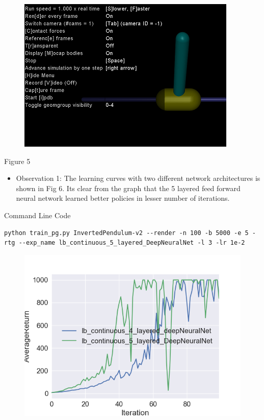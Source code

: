 \documentclass[10pt]{article}
\makeatletter
\def\maxwidth{\ifdim\Gin@nat@width>\linewidth\linewidth
\else\Gin@nat@width\fi}
\let\Oldincludegraphics\includegraphics
\renewcommand{\includegraphics}[1]{\Oldincludegraphics[width=\maxwidth]{#1}}
\makeatother
\begin{document}
\begin{figure}
\centering
\includegraphics{Images/pendulum_continuous.PNG}
\caption{}
\end{figure}

Figure 5

\begin{itemize}
\item
  Observation 1: The learning curves with two different network
  architectures is shown in Fig 6. Its clear from the graph that the 5
  layered feed forward neural network learned better policies in lesser
  number of iterations.
\end{itemize}

Command Line Code

\begin{verbatim}
python train_pg.py InvertedPendulum-v2 --render -n 100 -b 5000 -e 5 -rtg --exp_name lb_continuous_5_layered_DeepNeuralNet -l 3 -lr 1e-2
\end{verbatim}

\begin{figure}
\centering
\includegraphics{Images/inverted.png}
\caption{}
\end{figure}
\end{document}
